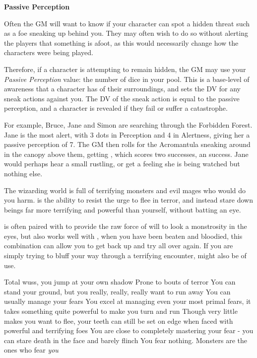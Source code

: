 {\bf Passive Perception}

Often the GM will want to know if your character can spot a hidden threat such as a foe sneaking up behind you. They may often wish to do so without alerting the players that something is afoot, as this would necessarily change how the characters were being played. 

Therefore, if a character is attempting to remain hidden, the GM may use your {\it Passive Perception} value: the number of dice in your  pool. This is a base-level of awareness that a character has of their surroundings, and sets the DV for any sneak actions against you. The DV of the sneak action is equal to the passive perception, and a character is revealed if they fail or suffer a catastrophe. 

For example, Bruce, Jane and Simon are searching through the Forbidden Forest. Jane is the most alert, with 3 dots in Perception and 4 in Alertness, giving her a passive perception of 7. The GM then rolls for the Acromantula sneaking around in the canopy above them, getting , which scores two successes, an  success. Jane would perhaps hear a small rustling, or get a feeling she is being watched but nothing else. 



The wizarding world is full of terrifying monsters and evil mages who would do you harm.  is the ability to resist the urge to flee in terror, and instead stare down beings far more terrifying and powerful than yourself, without batting an eye. 

 is often paired with  to provide the raw force of will to look a monstrosity in the eyes, but also works well with , when you have been beaten and bloodied, this combination can allow you to get back up and try all over again. If you are simply trying to bluff your way through a terrifying encounter,  might also be of use. 

\ratingTable
{Total wuss, you jump at your own shadow}
{Prone to bouts of terror}
{You can stand your ground, but you really, really, really want to run away}
{You can usually manage your fears}
{You excel at managing even your most primal fears, it takes something quite powerful to make you turn and run}
{Though very little makes you want to flee, your teeth can still be set on edge when faced with powerful and terrifying foes}
{You are close to completely mastering your fear - you can stare death in the face and barely flinch}
{You fear nothing. Monsters are the ones who fear {\it you} }

